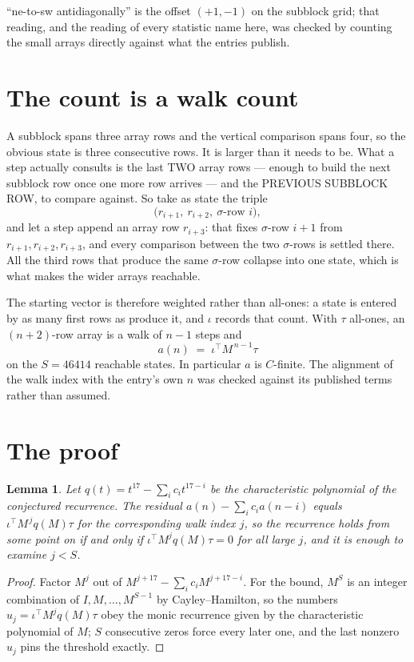 \documentclass[11pt,a4paper]{article}
\theoremstyle{plain}
\newtheorem{lemma}[theorem]{Lemma}
\theoremstyle{definition}
\begin{document}
``ne-to-sw antidiagonally'' is the offset $(+1,-1)$ on the subblock grid; that reading, and
the reading of every statistic name here, was checked by counting the small arrays directly
against what the entries publish.

\section{The count is a walk count}

A subblock spans three array rows and the vertical comparison spans four, so the obvious state
is three consecutive rows. It is larger than it needs to be. What a step actually consults is
the last TWO array rows --- enough to build the next subblock row once one more row arrives ---
and the PREVIOUS SUBBLOCK ROW, to compare against. So take as state the triple
\[
\bigl(r_{i+1},\ r_{i+2},\ \sigma\text{-row }i\bigr),
\]
and let a step append an array row $r_{i+3}$: that fixes $\sigma$-row $i+1$ from
$r_{i+1},r_{i+2},r_{i+3}$, and every comparison between the two $\sigma$-rows is settled
there. All the third rows that produce the same $\sigma$-row collapse into one state, which is
what makes the wider arrays reachable.

The starting vector is therefore weighted rather than all-ones: a state is entered by as many
first rows as produce it, and $\iota$ records that count. With $\tau$ all-ones, an
$(n+2)$-row array is a walk of $n-1$ steps and
\[
a(n)\;=\;\iota^{\!\top}M^{\,n-1}\tau
\]
on the $S=46414$ reachable states. In particular $a$ is $C$-finite. The alignment of the walk
index with the entry's own $n$ was checked against its published terms rather than assumed.

\section{The proof}

\begin{lemma}\label{lem:crit}
Let $q(t)=t^{17}-\sum_i c_it^{17-i}$ be the characteristic polynomial of the
conjectured recurrence. The residual $a(n)-\sum_ic_ia(n-i)$ equals
$\iota^{\!\top}M^{\,j}q(M)\tau$ for the corresponding walk index $j$, so the recurrence
holds from some point on if and only if $\iota^{\!\top}M^{j}q(M)\tau=0$ for all large $j$,
and it is enough to examine $j<S$.
\end{lemma}

\begin{proof}
Factor $M^{j}$ out of $M^{j+17}-\sum_ic_iM^{j+17-i}$. For the bound, $M^{S}$
is an integer combination of $I,M,\dots,M^{S-1}$ by Cayley--Hamilton, so the numbers
$u_j=\iota^{\!\top}M^{j}q(M)\tau$ obey the monic recurrence given by the characteristic
polynomial of $M$; $S$ consecutive zeros force every later one, and the last nonzero $u_j$
pins the threshold exactly.
\end{proof}
\end{document}
